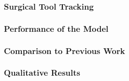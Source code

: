 \subsubsection{Surgical Tool Tracking}



\subsubsection{Performance of the Model}




\subsubsection{Comparison to Previous Work}

\subsubsection{Qualitative Results}

